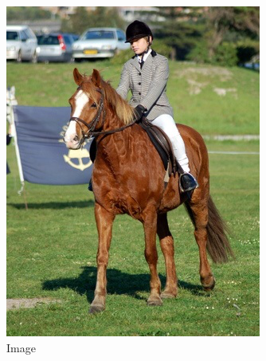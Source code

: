 \begin{figure}[t]
  \captionsetup[subfigure]{labelformat=empty}
  \begin{subfigure}[b]{0.244\textwidth}
    \includegraphics[width=\textwidth]{gfx/app-segmentation-1}
    \caption{Image}
  \end{subfigure}
  \begin{subfigure}[b]{0.244\textwidth}

\end{subfigure}
\end{figure}
